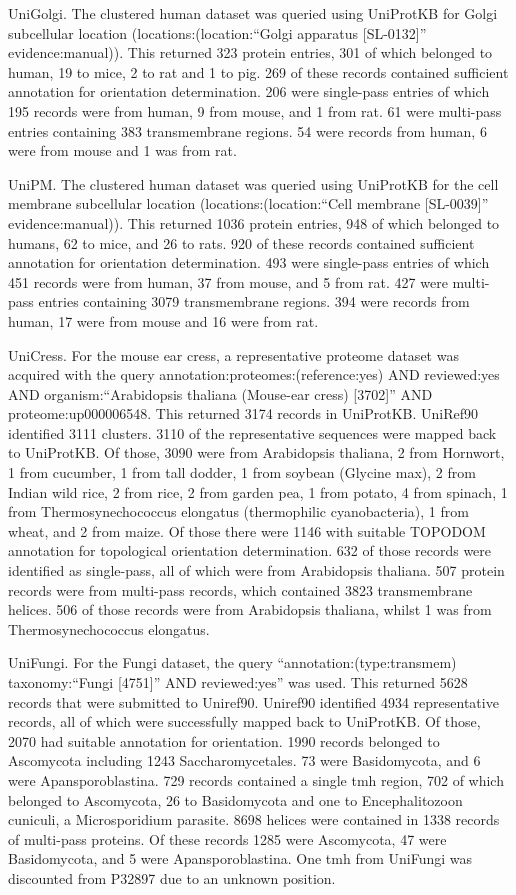 UniGolgi. The clustered human dataset was queried using UniProtKB for Golgi subcellular location (locations:(location:``Golgi apparatus [SL-0132]'' evidence:manual)). This returned 323 protein entries, 301 of which belonged to human, 19 to mice, 2 to rat and 1 to pig. 269 of these records contained sufficient annotation for orientation determination. 206 were single-pass entries of which 195 records were from human, 9 from mouse, and 1 from rat. 61 were multi-pass entries containing 383 transmembrane regions. 54 were records from human, 6 were from mouse and 1 was from rat.

UniPM. The clustered human dataset was queried using UniProtKB for the cell membrane subcellular location (locations:(location:``Cell membrane [SL-0039]'' evidence:manual)). This returned 1036 protein entries, 948 of which belonged to humans, 62 to mice, and 26 to rats. 920 of these records contained sufficient annotation for orientation determination. 493 were single-pass entries of which 451 records were from human, 37 from mouse, and 5 from rat. 427 were multi-pass entries containing 3079 transmembrane regions. 394 were records from human, 17 were from mouse and 16 were from rat.

UniCress. For the mouse ear cress, a representative proteome dataset was acquired with the query annotation:proteomes:(reference:yes) AND reviewed:yes AND organism:``Arabidopsis thaliana (Mouse-ear cress) [3702]'' AND proteome:up000006548. This returned 3174 records in UniProtKB. UniRef90 identified 3111 clusters. 3110 of the representative sequences were mapped back to UniProtKB. Of those, 3090 were from Arabidopsis thaliana, 2 from Hornwort, 1 from cucumber, 1 from tall dodder, 1 from soybean (Glycine max), 2 from Indian wild rice, 2 from rice, 2 from garden pea, 1 from potato, 4 from spinach, 1 from Thermosynechococcus elongatus (thermophilic cyanobacteria), 1 from wheat, and 2 from maize. Of those there were 1146 with suitable TOPO\textunderscore DOM annotation for topological orientation determination. 632 of those records were identified as single-pass, all of which were from Arabidopsis thaliana. 507 protein records were from multi-pass records, which contained 3823 transmembrane helices. 506 of those records were from Arabidopsis thaliana, whilst 1 was from Thermosynechococcus elongatus.

UniFungi. For the Fungi dataset, the query ``annotation:(type:transmem) taxonomy:``Fungi [4751]'' AND reviewed:yes'' was used. This returned 5628 records that were submitted to Uniref90. Uniref90 identified 4934 representative records, all of which were successfully mapped back to UniProtKB. Of those, 2070 had suitable annotation for orientation. 1990 records belonged to Ascomycota including 1243 Saccharomycetales. 73 were Basidomycota, and 6 were Apansporoblastina. 729 records contained a single \gls{tmh} region, 702 of which belonged to Ascomycota, 26 to Basidomycota and one to Encephalitozoon cuniculi, a Microsporidium parasite. 8698 helices were contained in 1338 records of multi-pass proteins. Of these records 1285 were Ascomycota, 47 were Basidomycota, and 5 were Apansporoblastina. One \gls{tmh} from UniFungi was discounted from P32897 due to an unknown position.

